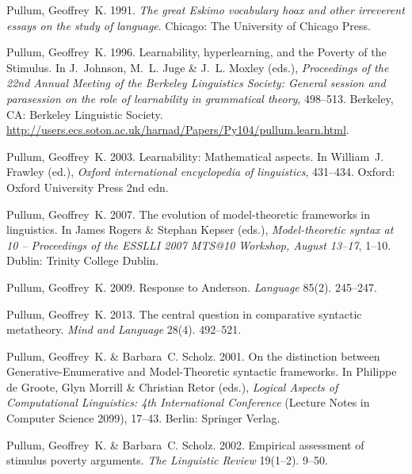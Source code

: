 \begin{thebibliography}{1420}
Pullum, Geoffrey~K. 1991.
\newblock \emph{The great {Eskimo} vocabulary hoax and other irreverent essays
  on the study of language}.
\newblock Chicago: The University of Chicago Press.

Pullum, Geoffrey~K. 1996.
\newblock Learnability, hyperlearning, and the {Poverty of the Stimulus}.
\newblock In J.~Johnson, M.~L. Juge \& J.~L. Moxley (eds.), \emph{Proceedings
  of the {22nd Annual Meeting of the Berkeley Linguistics Society}: {General}
  session and parasession on the role of learnability in grammatical theory},
  498--513. Berkeley, CA: {Berkeley Linguistic Society}.
\newblock
  \urlprefix\url{http://users.ecs.soton.ac.uk/harnad/Papers/Py104/pullum.learn.html}.

Pullum, Geoffrey~K. 2003.
\newblock Learnability: {Mathematical} aspects.
\newblock In William~J. Frawley (ed.), \emph{Oxford international encyclopedia
  of linguistics}, 431--434. Oxford: Oxford University Press 2nd edn.

Pullum, Geoffrey~K. 2007.
\newblock The evolution of model-theoretic frameworks in linguistics.
\newblock In James Rogers \& Stephan Kepser (eds.), \emph{Model-theoretic
  syntax at 10 -- {Proceedings} of the {ESSLLI 2007 MTS@10 Workshop, August
  13--17}}, 1--10. Dublin: Trinity College Dublin.

Pullum, Geoffrey~K. 2009.
\newblock Response to {Anderson}.
\newblock \emph{Language} 85(2). 245--247.

Pullum, Geoffrey~K. 2013.
\newblock The central question in comparative syntactic metatheory.
\newblock \emph{Mind and Language} 28(4). 492--521.

Pullum, Geoffrey~K. \& Barbara~C. Scholz. 2001.
\newblock On the distinction between {Generative-Enumerative} and
  {Model-Theoretic} syntactic frameworks.
\newblock In Philippe {de Groote}, Glyn Morrill \& Christian Retor (eds.),
  \emph{{Logical Aspects of Computational Linguistics}: {4th International
  Conference}} (Lecture Notes in Computer Science 2099), 17--43. Berlin:
  Springer Verlag.

Pullum, Geoffrey~K. \& Barbara~C. Scholz. 2002.
\newblock Empirical assessment of stimulus poverty arguments.
\newblock \emph{The Linguistic Review} 19(1--2). 9--50.


\end{thebibliography}
